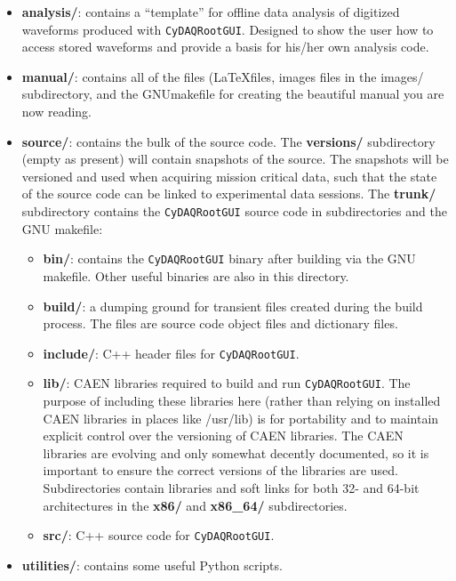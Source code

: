 \begin{itemize}
  \item{\textbf{analysis/}: contains a ``template'' for offline data
    analysis of digitized waveforms produced with
    \texttt{CyDAQRootGUI}. Designed to show the user how to access
    stored waveforms and provide a basis for his/her own analysis
    code.}
  \item{\textbf{manual/}: contains all of the files (\LaTeX files,
    images files in the images/ subdirectory, and the GNUmakefile for
    creating the beautiful manual you are now reading.}
  \item{\textbf{source/}: contains the bulk of the \ADAQ source
    code. The \textbf{versions/} subdirectory (empty as present) will
    contain snapshots of the \ADAQ source. The snapshots will be
    versioned and used when acquiring mission critical data, such that
    the state of the \ADAQ source code can be linked to experimental
    data sessions. The \textbf{trunk/} subdirectory contains the
    \texttt{CyDAQRootGUI} source code in subdirectories and the GNU
    makefile:
    \begin{itemize}
      \item{\textbf{bin/}: contains the \texttt{CyDAQRootGUI} binary
        after building via the GNU makefile. Other useful binaries are
        also in this directory.}
      \item{\textbf{build/}: a dumping ground for transient files
        created during the build process. The files are source code
        object files and \ROOT dictionary files.}
      \item{\textbf{include/}: C++ header files for
        \texttt{CyDAQRootGUI}.}
      \item{\textbf{lib/}: CAEN libraries required to build and run
        \texttt{CyDAQRootGUI}. The purpose of including these
        libraries here (rather than relying on installed CAEN
        libraries in places like /usr/lib) is for portability and to
        maintain explicit control over the versioning of CAEN
        libraries. The CAEN libraries are evolving and only somewhat
        decently documented, so it is important to ensure the correct
        versions of the libraries are used. Subdirectories contain
        libraries and soft links for both 32- and 64-bit architectures
        in the \textbf{x86/} and \textbf{x86\_64/} subdirectories.}
      \item{\textbf{src/}: C++ source code for \texttt{CyDAQRootGUI}.}
    \end{itemize}
  }
  \item{\textbf{utilities/}: contains some useful Python scripts.}
\end{itemize}

